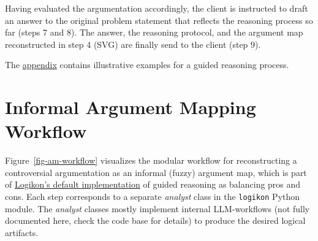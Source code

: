 \documentclass[
  letterpaper,
  DIV=11,
  numbers=noendperiod]{scrartcl}
\begin{document}
Having evaluated the argumentation accordingly, the client is instructed
to draft an answer to the original problem statement that reflects the
reasoning process so far (steps 7 and 8). The answer, the reasoning
protocol, and the argument map reconstructed in step 4 (SVG) are finally
send to the client (step 9).

The \protect\hyperlink{appendix}{appendix} contains illustrative
examples for a guided reasoning process.

\hypertarget{informal-argument-mapping-workflow}{%
\section{Informal Argument Mapping
Workflow}\label{informal-argument-mapping-workflow}}

Figure~\ref{fig-am-workflow} visualizes the modular workflow for
reconstructing a controversial argumentation as an informal (fuzzy)
argument map, which is part of
\protect\hyperlink{guiding-client-reasoners-in-balancing-pros-and-cons}{Logikon's
default implementation} of guided reasoning as balancing pros and cons.
Each step corresponds to a separate \emph{analyst} class in the
\texttt{logikon} Python module. The \emph{analyst} classes mostly
implement internal LLM-workflows (not fully documented here, check the
code base for details) to produce the desired logical artifacts.
\end{document}
